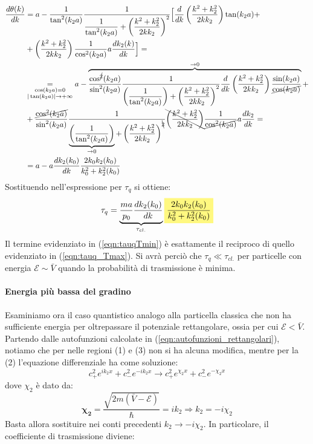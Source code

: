 \documentclass[../../FisicaTeorica.tex]{subfiles}
\begin{document}
\begin{itemize}
\begin{align*}
\frac{d\theta(k)}{dk}&=a-\frac{1}{\tan^2(k_2a)}\frac{1}{\displaystyle \frac{1}{\tan^2(k_2a)}+\left(\frac{k^2+k_2^2}{2kk_2} \right)^2}\Big[
\frac{d}{dk}\left(\frac{k^2+k_2^2}{2kk_2}\right)\tan(k_2a)+\\
&+\left(\frac{k^2+k_2^2}{2kk_2}\right)\frac{1}{\cos^2(k_2a)}a\frac{dk_2(k)}{dk}
\Big]=\\
&\underset{\substack{\cos(k_2a)=0\\|\tan(k_2a)|\to+\infty}}{=} a-\overbrace{\frac{\cos^{\cancel{2}}(k_2 a)}{\sin^2(k_2a)}\frac{1}{\displaystyle{\left(\frac{1}{\tan^2(k_2a)}\right)}+\left(\frac{k^2+k_2^2}{2kk_2}\right)^2}\frac{d}{dk}\left(\frac{k^2+k_2^2}{2kk_2}\right)\frac{\sin(k_2a)}{\cancel{\cos(k_2a)}}}^{\to0}+\\
&+\frac{\cancel{\cos^2(k_2a)}}{\sin^2(k_2a)}\frac{1}{\displaystyle \underbrace{\left(\frac{1}{\tan^2(k_2a)}\right)}_{\to 0}+\left(\frac{k^2+k_2^2}{2kk_2}\right)^{\bcancel{2}}}\bcancel{\left(\frac{k^2+k_2^2}{2kk_2}\right)}\frac{1}{\cancel{\cos^2(k_2a)}}a\frac{dk_2}{dk}=\\
&=a-a\frac{dk_{2}(k_0)}{dk}\frac{2k_0k_2(k_0)}{k_0^2+k_2^2(k_0)}
\end{align*}
Sostituendo nell'espressione per $\tau_q$ si ottiene:
\begin{equation}
\tau_q = \underbrace{\frac{ma}{p_0}\frac{dk_2(k_0)}{dk}}_{\tau_{cl.}}\hlc{Yellow}{\frac{2k_0k_2(k_0)}{k_0^2+k_2^2(k_0)}}
\label{eqn:tauqTmin}
\end{equation}
Il termine evidenziato in (\ref{eqn:tauqTmin}) è esattamente il reciproco di quello evidenziato in (\ref{eqn:tauq_Tmax}). Si avrà perciò che $\tau_{q} \ll \tau_{cl.}$ per particelle con energia $\mathcal{E}\sim\bar{V}$ quando la probabilità di trasmissione è minima.
\end{itemize}

\paragraph{Energia più bassa del gradino\\}
Esaminiamo ora il caso quantistico analogo alla particella classica che non ha sufficiente energia per oltrepassare il potenziale rettangolare, ossia per cui $\mathcal{E}<\bar{V}$.\\
Partendo dalle autofunzioni calcolate in (\ref{eqn:autofunzioni_rettangolari}), notiamo che per nelle regioni (1) e (3) non si ha alcuna modifica, mentre per la (2) l'equazione differenziale ha come soluzione:
\[
c^2_+ e^{ik_2 x} + c^2_- e^{-ik_2 x}\to c^2_+ e^{\chi_2 x}+c^2_- e^{-\chi_2 x}
\]
dove $\chi_2$ è dato da:
\[
\bm{\chi_2} = \frac{\sqrt{2m(\bar{V}-\mathcal{E})}}{\hbar}=ik_2 \Rightarrow k_2=-i\chi_2
\]
Basta allora sostituire nei conti precedenti $k_2 \to -i\chi_2$. In particolare, il coefficiente di trasmissione diviene:
\end{document}
